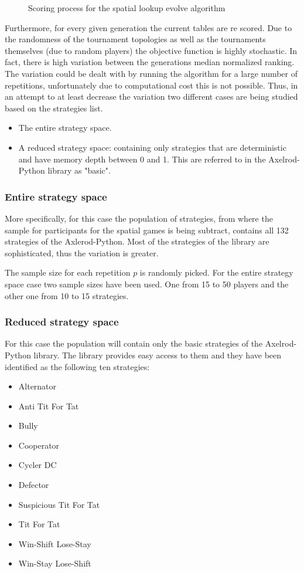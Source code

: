 \begin{figure}[!hbtp]
		
		\caption{Scoring process for the spatial lookup evolve algorithm}
  \label{fig:objective}
\end{figure}

Furthermore, for every given generation the current tables are re scored.
Due to the randomness of the tournament topologies as well as the tournaments
themselves (due to random players) the objective function is highly stochastic.
In fact, there is high variation between the generations median
normalized ranking. The variation could be dealt with by running the algorithm
for a large number of repetitions, unfortunately due to computational cost this
is not possible. Thus, in an attempt to at least decrease the variation two different
cases are being studied based on the strategies list.
\begin{itemize}
  \item The entire strategy space.
  \item A reduced strategy space: containing only strategies that are deterministic
        and have memory depth between 0 and 1. This are referred to in the
        Axelrod-Python library as "basic".
\end{itemize}


\subsubsection{Entire strategy space}

More specifically, for this case
the population of strategies, from where the sample for participants for
the spatial games is being subtract, contains all 132 strategies of the
Axlerod-Python. Most of the strategies of the library are sophisticated, thus
the variation is greater.

The sample size for each repetition \(p\) is randomly picked. For the
entire strategy space case two sample sizes have been used. One from
15 to 50 players and the other one from 10 to 15 strategies.

\subsubsection{Reduced strategy space}

For this case the population will contain only
the basic strategies of the Axelrod-Python library. The library provides
easy access to them and they have been identified as the following ten strategies:
\begin{itemize}
   \item Alternator
   \item Anti Tit For Tat
   \item Bully
   \item Cooperator
   \item Cycler DC
   \item Defector
   \item Suspicious Tit For Tat
   \item Tit For Tat
   \item Win-Shift Lose-Stay
   \item Win-Stay Lose-Shift
\end{itemize}

